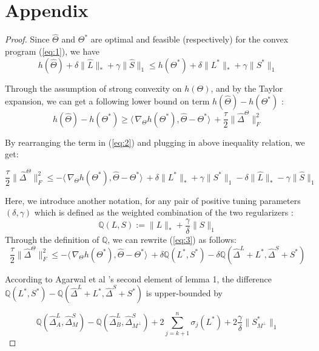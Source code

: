 \documentclass[AMS,STIX1COL]{WileyNJD-v2}
\begin{document}
\section{Appendix}
\begin{proof}
Since $\widehat{\Theta}$ and $\Theta^{*}$ are optimal and feasible (respectively) for the convex program (\ref{eq:1}), we have
\begin{equation}\label{eq:2}
    h(\widehat{\Theta}) + \delta\|\widehat{L}\|_{*} + \gamma\|\widehat{S}\|_{1} \leq  
     h(\Theta^{*}) + \delta\|{L^{*}}\|_{*} + \gamma\|{S}^{*}\|_{1}
\end{equation}

Through the assumption of strong convexity on $h(\Theta)$, and by the Taylor expansion, we can get a following lower bound on term $h(\widehat{\Theta})-h(\Theta^{*})$ :
\[
h(\widehat{\Theta})-h(\Theta^{*}) \geq 
\langle\, \nabla_{\Theta}h(\Theta^{*}),\widehat{\Theta}-\Theta^{*}\rangle\ + \frac{\tau}{2}\|\widehat{\Delta}^{\Theta}\|_{F}^{2}
\]

By rearranging the term in (\ref{eq:2}) and plugging in above inequality relation, we get:

\begin{equation}\label{eq:3}
    \frac{\tau}{2}\|\widehat{\Delta}^{\Theta}\|_{F}^{2} \leq
    -\langle\,\nabla_{\Theta}h(\Theta^{*}),\widehat{\Theta}-\Theta^{*}\rangle\
    + \delta \|L^{*}\|_\ast + \gamma \|S^{*}\|_1 
    - \delta \|\widehat{L}\|_\ast - \gamma \|\widehat{S}\|_1
\end{equation}

Here, we introduce another notation, for any pair of positive tuning parameters $(\delta,\gamma)$ which is defined as the weighted combination of the two regularizers : 
\[
\mathbb{Q}(L,S)   := \|L\|_{*} + \frac{\gamma}{\delta}\|S\|_1
\]
Through the definition of $\mathbb{Q}$, we can rewrite (\ref{eq:3}) as follows:
\begin{equation}\label{eq:4}
    \frac{\tau}{2}\|\widehat{\Delta}^{\Theta}\|_{F}^{2} \leq
    -\langle\,\nabla_{\Theta}h(\Theta^{*}),\widehat{\Theta}-\Theta^{*}\rangle\
    + \delta \mathbb{Q}(L^{*},S^{*}) - \delta \mathbb{Q}(\widehat{\Delta}^L + L^{*},\widehat{\Delta}^S + S^{*})
\end{equation}

According to Agarwal et al \cite{agarwal2012noisy}'s second element of lemma 1, 
the difference $\mathbb{Q}(L^*,S^*)- \mathbb{Q}(\widehat{\Delta}^L + L^{*},\widehat{\Delta}^S + S^{*})$ is upper-bounded by 

\begin{equation}\label{eq:5}
    \mathbb{Q}(\widehat{\Delta}^L_{A},\widehat{\Delta}^S_{M}) - \mathbb{Q}(\widehat{\Delta}^L_{B},\widehat{\Delta}^S_{M^\perp})
    +2 \sum_{j=k+1}^{n} \sigma_{j}(L^*) + 2\frac{\gamma}{\delta}\|S^*_{M^\perp}\|_{1}
\end{equation}


\end{proof}
\end{document}
